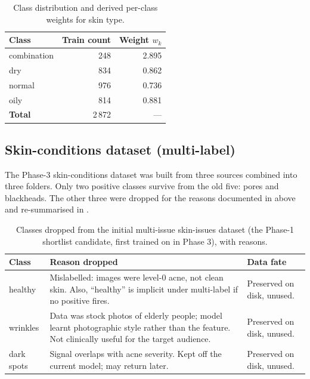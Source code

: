 \documentclass[11pt,a4paper,oneside]{report}
\begin{document}
\begin{table}[htbp]
    \centering
    \caption{Class distribution and derived per-class weights for skin type.}
    \label{tab:skin-type-weights}
    \small
    \begin{tabular}{lrr}
        \toprule
        \textbf{Class} & \textbf{Train count} & \textbf{Weight \(w_k\)} \\
        \midrule
        combination & 248 & 2.895 \\
        dry         & 834 & 0.862 \\
        normal      & 976 & 0.736 \\
        oily        & 814 & 0.881 \\
        \midrule
        \textbf{Total} & 2\,872 & --- \\
        \bottomrule
    \end{tabular}
\end{table}

\subsection{Skin-conditions dataset (multi-label)}\label{sec:conditions-dataset}

The Phase-3 skin-conditions dataset was built from three sources
combined into three folders. Only two positive classes survive from
the old five: pores and blackheads. The other three were dropped for
the reasons documented in  above and re-summarised in
.

\begin{table}[htbp]
    \centering
    \caption{Classes dropped from the initial multi-issue skin-issues
    dataset (the Phase-1 shortlist candidate, first trained on in
    Phase 3), with reasons.}
    \label{tab:dropped-classes}
    \small
    \begin{tabularx}{\linewidth}{lXl}
        \toprule
        \textbf{Class} & \textbf{Reason dropped} & \textbf{Data fate} \\
        \midrule
        healthy    & Mislabelled: images were level-0 acne, not clean skin. Also, ``healthy'' is implicit under multi-label if no positive fires. & Preserved on disk, unused. \\
        wrinkles   & Data was stock photos of elderly people; model learnt photographic style rather than the feature. Not clinically useful for the target audience. & Preserved on disk, unused. \\
        dark spots & Signal overlaps with acne severity. Kept off the current model; may return later. & Preserved on disk, unused. \\
        \bottomrule
    \end{tabularx}
\end{table}
\end{document}
